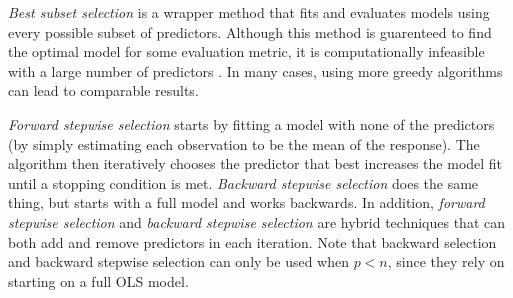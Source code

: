 \documentclass[final,onefignum,onetabnum]{siuro210301}
\begin{document}

	
	\textit{Best subset selection} is a wrapper method that fits and evaluates models using every possible subset of predictors. Although this method is guarenteed to find the optimal model for some evaluation metric, it is computationally infeasible with a large number of predictors \cite{miller2002subset}. In many cases, using more greedy algorithms can lead to comparable results.
	
	\textit{Forward stepwise selection} starts by fitting a model with none of the predictors (by simply estimating each observation to be the mean of the response). The algorithm then iteratively chooses the predictor that best increases the model fit until a stopping condition is met. \textit{Backward stepwise selection} does the same thing, but starts with a full model and works backwards. In addition, \textit{forward stepwise selection} and \textit{backward stepwise selection} are hybrid techniques that can both add and remove predictors in each iteration. Note that backward selection and backward stepwise selection can only be used when $p < n$, since they rely on starting on a full OLS model.
	
\end{document}
